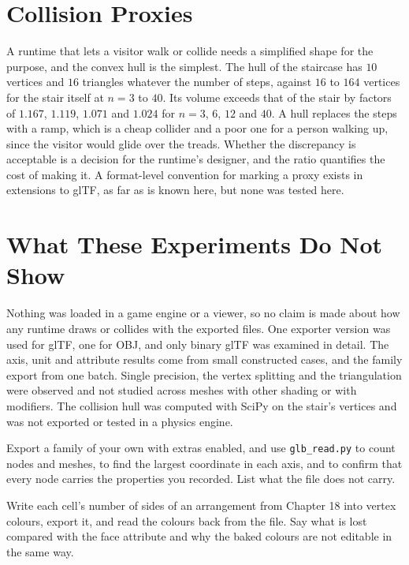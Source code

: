 \section{Collision Proxies}

A runtime that lets a visitor walk or collide needs a simplified shape for the purpose, and the convex hull is the simplest. The hull of the staircase has $10$ vertices and $16$ triangles whatever the number of steps, against $16$ to $164$ vertices for the stair itself at $n=3$ to $40$. Its volume exceeds that of the stair by factors of $1.167$, $1.119$, $1.071$ and $1.024$ for $n=3$, $6$, $12$ and $40$. A hull replaces the steps with a ramp, which is a cheap collider and a poor one for a person walking up, since the visitor would glide over the treads. Whether the discrepancy is acceptable is a decision for the runtime's designer, and the ratio quantifies the cost of making it. A format-level convention for marking a proxy exists in extensions to glTF, as far as is known here, but none was tested here.

\section{What These Experiments Do Not Show}

Nothing was loaded in a game engine or a viewer, so no claim is made about how any runtime draws or collides with the exported files. One exporter version was used for glTF, one for OBJ, and only binary glTF was examined in detail. The axis, unit and attribute results come from small constructed cases, and the family export from one batch. Single precision, the vertex splitting and the triangulation were observed and not studied across meshes with other shading or with modifiers. The collision hull was computed with SciPy on the stair's vertices and was not exported or tested in a physics engine.

\begin{exercise}
Export a family of your own with extras enabled, and use \texttt{glb\_read.py} to count nodes and meshes, to find the largest coordinate in each axis, and to confirm that every node carries the properties you recorded. List what the file does not carry.
\end{exercise}

\begin{exercise}
Write each cell's number of sides of an arrangement from Chapter 18 into vertex colours, export it, and read the colours back from the file. Say what is lost compared with the face attribute and why the baked colours are not editable in the same way.
\end{exercise}

